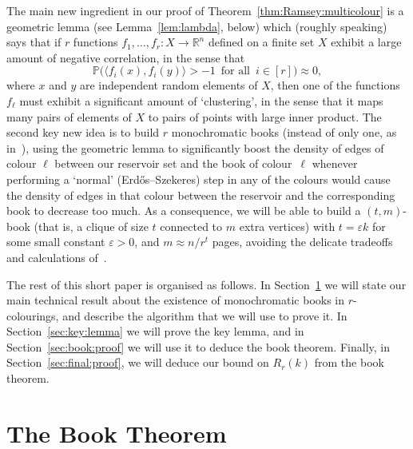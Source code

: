 \documentclass[12pt,reqno]{amsart}
\theoremstyle{definition}
\theoremstyle{remark}
\newcommand\R{\mathbb{R}}
\def\Pr{\mathbb{P}}
\newcommand\eps{\varepsilon}
\renewcommand{\to}{\rightarrow}
\def\eps{\varepsilon}
\def\R{\mathbb{R}}
\def\<{\langle}
\def\>{\rangle}
\begin{document}
The main new ingredient in our proof of Theorem~\ref{thm:Ramsey:multicolour} %
is a geometric lemma (see Lemma~\ref{lem:lambda}, below) which (roughly speaking) says that if $r$ functions $f_1,\ldots,f_r \colon X \to \R^n$ defined on a finite set $X$ exhibit a large amount of negative correlation, in the sense that 
$$\Pr\Big( \big\< f_i(x), f_i(y) \big\> > - 1 \,\text{ for all }\, i \in [r] \Big) \approx 0,$$
where $x$ and $y$ are independent random elements of $X$, then one of the functions $f_\ell$ must exhibit a significant amount of `clustering', in the sense that it maps many pairs of elements of $X$ to pairs of points with large inner product. The second key new idea is to build $r$ monochromatic books (instead of only one, as in~\cite{CGMS}), using the geometric lemma to significantly boost the density of edges of colour $\ell$ between our reservoir set and the book of colour~$\ell$ whenever performing a `normal' (Erd\H{o}s--Szekeres) step in any of the colours would cause the density of edges in that colour between the reservoir and the corresponding book to decrease too much. As a consequence, we will be able to build a $(t,m)$-book (that is, a clique of size $t$ connected to $m$ extra vertices) with $t = \eps k$ for some small constant $\eps > 0$, and $m \approx n / r^t$ pages, avoiding the delicate tradeoffs and calculations of~\cite{CGMS}. 

The rest of this short paper is organised as follows. In Section~\ref{sec:book:thm} we will state our main technical result about the existence of monochromatic books in $r$-colourings, and describe the algorithm that we will use to prove it. In Section~\ref{sec:key:lemma} we will prove the key lemma, and in Section~\ref{sec:book:proof} we will use it to deduce the book theorem. Finally, in Section~\ref{sec:final:proof}, we will deduce our bound on $R_r(k)$ from the book theorem.   




\section{The Book Theorem}\label{sec:book:thm}
\end{document}
